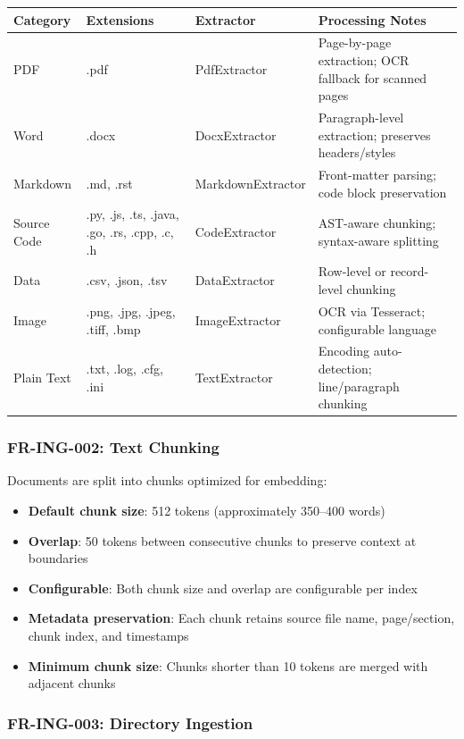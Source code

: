 \documentclass[11pt,a4paper]{article}
\begin{document}
\begin{longtable}{@{}p{2.5cm}p{3cm}p{3cm}p{4.5cm}@{}}
\toprule
\textbf{Category} & \textbf{Extensions} & \textbf{Extractor} & \textbf{Processing Notes} \\
\midrule
\endhead
PDF & .pdf & PdfExtractor & Page-by-page extraction; OCR fallback for scanned pages \\
Word & .docx & DocxExtractor & Paragraph-level extraction; preserves headers/styles \\
Markdown & .md, .rst & MarkdownExtractor & Front-matter parsing; code block preservation \\
Source Code & .py, .js, .ts, .java, .go, .rs, .cpp, .c, .h & CodeExtractor & AST-aware chunking; syntax-aware splitting \\
Data & .csv, .json, .tsv & DataExtractor & Row-level or record-level chunking \\
Image & .png, .jpg, .jpeg, .tiff, .bmp & ImageExtractor & OCR via Tesseract; configurable language \\
Plain Text & .txt, .log, .cfg, .ini & TextExtractor & Encoding auto-detection; line/paragraph chunking \\
\bottomrule
\end{longtable}

\subsubsection{FR-ING-002: Text Chunking}

Documents are split into chunks optimized for embedding:

\begin{itemize}
    \item \textbf{Default chunk size}: 512 tokens (approximately 350--400 words)
    \item \textbf{Overlap}: 50 tokens between consecutive chunks to preserve context at boundaries
    \item \textbf{Configurable}: Both chunk size and overlap are configurable per index
    \item \textbf{Metadata preservation}: Each chunk retains source file name, page/section, chunk index, and timestamps
    \item \textbf{Minimum chunk size}: Chunks shorter than 10 tokens are merged with adjacent chunks
\end{itemize}

\subsubsection{FR-ING-003: Directory Ingestion}
\end{document}
